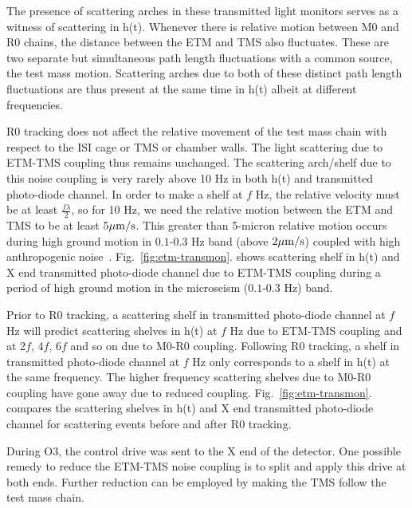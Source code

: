\documentclass[12pt]{iopart}
\begin{document}
The presence of scattering arches in these transmitted light monitors serves as a witness of scattering in h(t). Whenever there is relative motion between M0 and R0 chains, the distance between the ETM and TMS also fluctuates. These are two separate but simultaneous path length fluctuations with a common source, the test mass motion. Scattering arches due to both of these distinct path length fluctuations are thus present at the same time in h(t) albeit at different frequencies.
\par
R0 tracking does not affect the relative movement of the test mass chain with respect to the ISI cage or TMS or chamber walls. The light scattering due to ETM-TMS coupling thus remains unchanged. The scattering arch/shelf due to this noise coupling is very rarely above 10 Hz in both h(t) and transmitted photo-diode channel. In order to make a shelf at $f$ Hz, the relative velocity must be at least $\frac{f{\lambda}}{2}$, so for 10 Hz, we need the relative motion between the ETM and TMS to be at least $5\mu{\rm m/s}$. This greater than 5-micron relative motion occurs during high ground motion in $0.1$-$0.3$ Hz band (above $2\mu{\rm m/s}$) coupled with high anthropogenic noise~\cite{alogsid_trans}. Fig.~\ref{fig:etm-transmon}. shows scattering shelf in h(t) and X end transmitted photo-diode channel due to ETM-TMS coupling during a period of high ground motion in the microseism ($0.1$-$0.3$ Hz) band.
\par
Prior to R0 tracking, a scattering shelf in transmitted photo-diode channel at $f$ Hz will predict scattering shelves in h(t) at $f$ Hz due to ETM-TMS coupling and at 2$f$, 4$f$, 6$f$ and so on due to M0-R0 coupling. Following R0 tracking, a shelf in transmitted photo-diode channel at $f$ Hz only corresponds to a shelf in h(t) at the same frequency. The higher frequency scattering shelves due to M0-R0 coupling have gone away due to reduced coupling. Fig.~\ref{fig:etm-transmon}.
compares the scattering shelves in h(t) and X end transmitted photo-diode channel for scattering events before and after R0 tracking.
\par
During O3, the control drive was sent to the X end of the detector. One possible remedy to reduce the ETM-TMS noise coupling is to split and apply this drive at both ends. Further reduction can be employed by making the TMS follow the test mass chain. 
\end{document}
